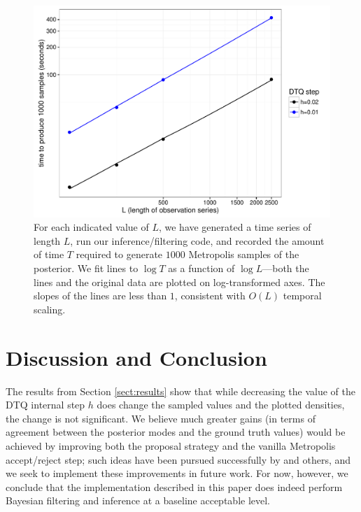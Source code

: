 \documentclass[wcp]{jmlr}
\begin{document}
\begin{figure}[th]
\begin{center}
\includegraphics[width=5in]{scaling}
\end{center}
\caption{For each indicated value of $L$, we have generated a time
  series of length $L$, run our inference/filtering code, and recorded
  the amount of time $T$ required to generate $1000$ Metropolis samples of
  the posterior.  We fit lines to $\log T$ as a function of $\log
  L$---both the lines and the original data are plotted on
  log-transformed axes.  The slopes of the lines are less than $1$,
  consistent with $O(L)$ temporal scaling.}
\label{fig:scaling}
\end{figure}


\section{Discussion and Conclusion}
\label{sect:conclusion}
The results from Section \ref{sect:results}
show that while decreasing the value of the DTQ internal step $h$ does
change the sampled values and the plotted densities, the change is not
significant.  We believe much greater gains (in terms of agreement
between the posterior modes and the ground truth values) would be achieved by
improving both the proposal strategy and the vanilla Metropolis
accept/reject step; such ideas have been pursued successfully by \citep{Fuchs2013} and others, and we seek
to implement these improvements in future work.  For now, however, we
conclude that the implementation described in this paper does indeed
perform Bayesian filtering and inference at a baseline acceptable
level.
\end{document}
